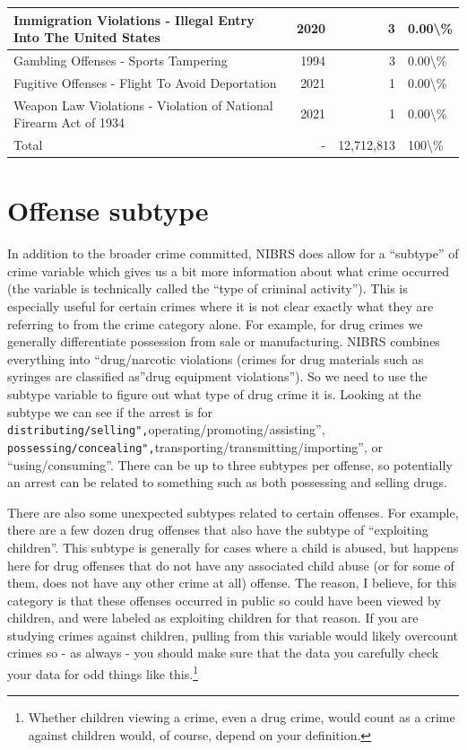 \documentclass[
]{krantz}
\begin{document}
\begin{longtable}[t]{l|r|r|l}
\hline
Immigration Violations - Illegal Entry Into The United States & 2020 & 3 & 0.00\textbackslash{}\%\\
\hline
Gambling Offenses - Sports Tampering & 1994 & 3 & 0.00\textbackslash{}\%\\
\hline
Fugitive Offenses - Flight To Avoid Deportation & 2021 & 1 & 0.00\textbackslash{}\%\\
\hline
Weapon Law Violations - Violation of National Firearm Act of 1934 & 2021 & 1 & 0.00\textbackslash{}\%\\
\hline
Total & - & 12,712,813 & 100\textbackslash{}\%\\
\hline
\end{longtable}

\section{Offense subtype}\label{offense-subtype}

In addition to the broader crime committed, NIBRS does allow
for a ``subtype'' of crime variable which gives us a bit
more information about what crime occurred (the variable is
technically called the ``type of criminal activity''). This
is especially useful for certain crimes where it is not
clear exactly what they are referring to from the crime
category alone. For example, for drug crimes we generally
differentiate possession from sale or manufacturing. NIBRS
combines everything into ``drug/narcotic violations (crimes
for drug materials such as syringes are classified as''drug
equipment violations''). So we need to use the subtype
variable to figure out what type of drug crime it is.
Looking at the subtype we can see if the arrest is for
\texttt{distributing/selling",}operating/promoting/assisting'',
\texttt{possessing/concealing",}transporting/transmitting/importing'',
or ``using/consuming''. There can be up to three subtypes
per offense, so potentially an arrest can be related to
something such as both possessing and selling drugs.

There are also some unexpected subtypes related to certain
offenses. For example, there are a few dozen drug offenses
that also have the subtype of ``exploiting children''. This
subtype is generally for cases where a child is abused, but
happens here for drug offenses that do not have any
associated child abuse (or for some of them, does not have
any other crime at all) offense. The reason, I believe, for
this category is that these offenses occurred in public so
could have been viewed by children, and were labeled as
exploiting children for that reason. If you are studying
crimes against children, pulling from this variable would
likely overcount crimes so - as always - you should make
sure that the data you carefully check your data for odd
things like this.\footnote{Whether children viewing a crime,
  even a drug crime, would count as a crime against children
  would, of course, depend on your definition.}
\end{document}
